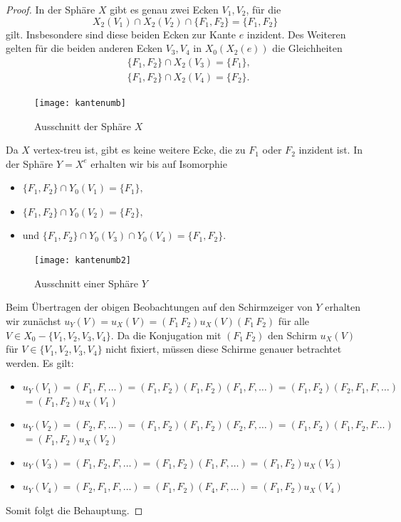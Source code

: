 \documentclass[12pt,titlepage,twoside,cleardoublepage]{article}
\theoremstyle{nummermitklammern}
\numberwithin{equation}{section}
\begin{document}
\begin{proof}
In der Sphäre $X$ gibt es genau zwei Ecken $V_1,V_2$, für die 
\[
X_2(V_1)\cap X_2(V_2)\cap \{F_1,F_2\}=\{F_1,F_2\}
\] 
gilt. Insbesondere sind diese beiden Ecken zur Kante $e$  inzident. Des Weiteren gelten für die beiden anderen Ecken $V_3,V_4$ in $X_0(X_2(e))$ die Gleichheiten 
\begin{align*}
&\{F_1,F_2\} \cap X_2(V_3)=\{F_1\},\\
&\{F_1,F_2\} \cap X_2(V_4)=\{F_2\}.
\end{align*}  
\begin{figure}[H]
\begin{center}
\texttt{[image: kantenumb]}
\end{center}
\caption{Ausschnitt der Sphäre $X$}
\end{figure}
Da $X$ vertex-treu ist, gibt es keine weitere Ecke, die zu $F_1$ oder $F_2$ inzident ist.
In der Sphäre $Y=X^e$ erhalten wir bis auf Isomorphie  
\begin{itemize}
\item $\{F_1,F_2\} \cap Y_0(V_1)=\{F_1\},$ 
\item $\{F_1,F_2\} \cap Y_0(V_2)=\{F_2\},$
\item und $\{F_1,F_2\} \cap Y_0(V_3)\cap Y_0(V_4)=\{F_1,F_2\}$.
\end{itemize}
\begin{figure}[H]
\begin{center}
\texttt{[image: kantenumb2]}
\end{center}
\caption{Ausschnitt einer Sphäre $Y$}
\end{figure}
Beim Übertragen der obigen Beobachtungen auf den Schirmzeiger von $Y$ erhalten wir zunächst $u_Y(V)=u_X(V)=(F_1\,F_2)u_X(V) (F_1\,F_2)$
für alle $V\in X_0-\{V_1,V_2,V_3,V_4\}.$
Da die Konjugation mit $(F_1\,F_2)$ den Schirm $u_X(V)$ für $V\in \{V_1,V_2,V_3,V_4\}$ nicht fixiert, müssen diese Schirme genauer betrachtet werden. 
Es gilt:
\begin{itemize} 
\item $u_{Y}(V_1)=(F_1,F,\ldots)=(F_1,F_2)(F_1,F_2)(F_1,F,\ldots)=(F_1,F_2)(F_2,F_1,F,\ldots)$ \\$=(F_1,F_2)u_X(V_1)$
\item $u_{Y}(V_2)=(F_2,F,\ldots)=(F_1,F_2)(F_1,F_2)(F_2,F,\ldots)=(F_1,F_2)(F_1,F_2,F\ldots)$\\$=(F_1,F_2)u_X(V_2)$
\item $u_{Y}(V_3)=(F_1,F_2,F,\ldots)=(F_1,F_2)(F_1,F,\ldots)=(F_1,F_2)u_X(V_3)$
\item $u_{Y}(V_4)=(F_2,F_1,F,\ldots)=(F_1,F_2)(F_4,F,\ldots)=(F_1,F_2)u_X(V_4)$
\end{itemize}
Somit folgt die Behauptung.
\end{proof}
\newpage
\end{document}
